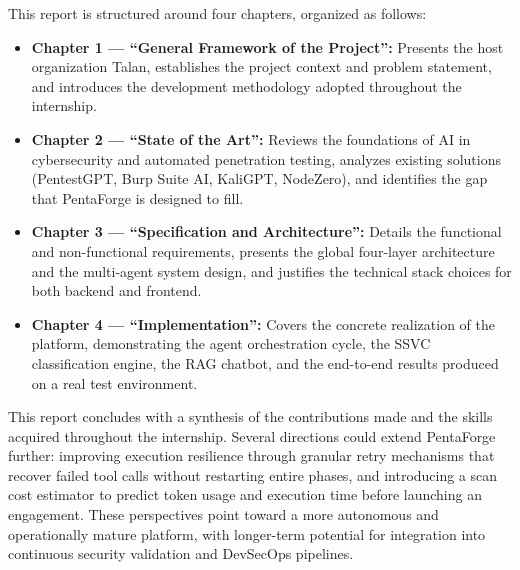 \documentclass[12pt,a4paper]{report}
\begin{document}
This report is structured around four chapters, organized as follows:

\vspace{0.4cm}

\begin{itemize}
    \setlength{\itemsep}{0.5cm}
    \item \textbf{Chapter 1 --- ``General Framework of the Project'':}
    Presents the host organization Talan, establishes the project context and problem
    statement, and introduces the development methodology adopted throughout the internship.

    \item \textbf{Chapter 2 --- ``State of the Art'':}
    Reviews the foundations of AI in cybersecurity and automated penetration testing,
    analyzes existing solutions (PentestGPT, Burp Suite AI, KaliGPT, NodeZero), and
    identifies the gap that PentaForge is designed to fill.

    \item \textbf{Chapter 3 --- ``Specification and Architecture'':}
    Details the functional and non-functional requirements, presents the global
    four-layer architecture and the multi-agent system design, and justifies the
    technical stack choices for both backend and frontend.

    \item \textbf{Chapter 4 --- ``Implementation'':}
    Covers the concrete realization of the platform, demonstrating the agent
    orchestration cycle, the SSVC classification engine, the RAG chatbot, and the
    end-to-end results produced on a real test environment.
\end{itemize}

\vspace{0.8cm}

This report concludes with a synthesis of the contributions made and the skills acquired
throughout the internship. Several directions could extend PentaForge further: improving
execution resilience through granular retry mechanisms that recover failed tool calls
without restarting entire phases, and introducing a scan cost estimator to predict token
usage and execution time before launching an engagement. These perspectives point toward
a more autonomous and operationally mature platform, with longer-term potential for
integration into continuous security validation and DevSecOps pipelines.
\newpage
\pagestyle{chapterone}

\vspace*{2cm}
\end{document}
